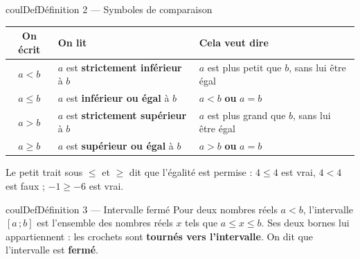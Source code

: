 \documentclass[11pt,a4paper]{article}
\makeatletter
\renewcommand{\le}{\leqslant}
\renewcommand{\ge}{\geqslant}
\newcommand{\lycee@intff}[2]{\left[#1\,;#2\right]}
\providecommand{\intff}{\lycee@intff}%
\newcounter{lycee@signet}
\newcommand{\signet}[3][]{\stepcounter{lycee@signet}%
  \edef\lycee@dest{\if\relax\detokenize{#1}\relax
    signet.\arabic{lycee@signet}\else#1\fi}%
  \hypertarget{\lycee@dest}{}\bookmark[level=#2,dest=\lycee@dest]{#3}}
\newenvironment{definitionbox}[1][Définition]%
  {\begin{boitecours}[phantom={\signet{2}{#1}}]{coulDef}{#1}}{\end{boitecours}}
\makeatother
\begin{document}
\begin{definitionbox}[Définition 2 --- Symboles de comparaison]
\begin{center}
\renewcommand{\arraystretch}{1.3}
\begin{tabular}{|c|l|l|}
\hline
\rowcolor{coulDef!10}\textbf{On écrit} & \textbf{On lit} & \textbf{Cela veut dire}\\\hline
$a<b$ & $a$ est \textbf{strictement inférieur} à $b$ & $a$ est plus petit que $b$, sans lui être égal\\\hline
$a\le b$ & $a$ est \textbf{inférieur ou égal} à $b$ & $a<b$ \textbf{ou} $a=b$\\\hline
$a>b$ & $a$ est \textbf{strictement supérieur} à $b$ & $a$ est plus grand que $b$, sans lui être égal\\\hline
$a\ge b$ & $a$ est \textbf{supérieur ou égal} à $b$ & $a>b$ \textbf{ou} $a=b$\\\hline
\end{tabular}
\end{center}
Le petit trait sous $\le$ et $\ge$ dit que l'égalité est permise : $4\le 4$ est vrai,
$4<4$ est faux ; $-1\ge -6$ est vrai.
\end{definitionbox}


\begin{definitionbox}[Définition 3 --- Intervalle fermé]
Pour deux nombres réels $a<b$, l'intervalle $\intff{a}{b}$ est l'ensemble des nombres réels $x$ tels
que $a\le x\le b$. Ses deux bornes lui appartiennent : les crochets sont
\textbf{tournés vers l'intervalle}. On dit que l'intervalle est \textbf{fermé}.
\end{definitionbox}
\end{document}
